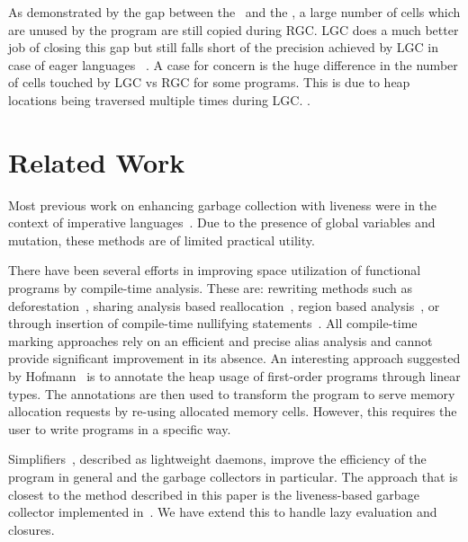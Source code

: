 \documentclass[preprint, 9pt]{sigplanconf}
\newcommand{\warning}[1]{{\color{Myred}{#1}}}
\begin{document}
As demonstrated by the gap between the \RGCLine\ and the \UseLine, a large number of cells 
which are unused by the program are still copied during RGC. LGC does a much better job of closing this gap 
but still falls short of the precision achieved by LGC in case of eager languages
~\cite{asati14lgc}. 
A case for concern is the huge difference in the number of cells touched by LGC vs RGC for some programs.
This is due to heap locations being  traversed multiple times during LGC. \warning{We have implemented heuristics to 
overcome common cases and they show promising results}.



\section{Related Work} 
\label{sec:relatedwork}
Most previous work on enhancing  garbage collection with liveness were
in   the  context   of   imperative  languages~\cite{Albert,   Hirzel,
  khedker07heap}.    Due  to  the  presence  of  global  variables  and
mutation, these methods are of  limited practical  utility.

There  have been  several efforts  in improving  space utilization  of
functional programs  by compile-time  analysis.  These  are: rewriting
methods                             such                            as
deforestation~\cite{wadler88deforest,gill93ashort,chitil99deforest},
sharing  analysis   based  reallocation~\cite{jones89compile},  region
based   analysis~\cite{tofte98region},   or   through   insertion   of
compile-time                                                nullifying
statements~\cite{inoue88analysis,lee05static,Hamilton}.            All
compile-time marking approaches rely on an efficient and precise alias
analysis and  cannot provide  significant improvement in  its absence.
An interesting  approach suggested by Hofmann~\cite{HofmannJ03}  is to
annotate the heap usage of  first-order programs through linear types.
The annotations are then used to transform the program to serve memory
allocation requests by re-using allocated memory cells.  However, this
requires the user to write programs in a specific way.

Simplifiers~\cite{ONeill}, described  as lightweight  daemons, improve
the efficiency of the program in general and the garbage collectors in
particular.  \warning{Most  of the  simplifications mentioned  in this
  work are subsumed by a liveness  based collector.  We feel this work
  is orthogonal  and can augment  our liveness based  collector.}  The
approach that is closest to the  method described in this paper is the
liveness-based garbage collector implemented in~\cite{asati14lgc}.  We
have extend this to handle lazy evaluation and closures.
 
\end{document}
